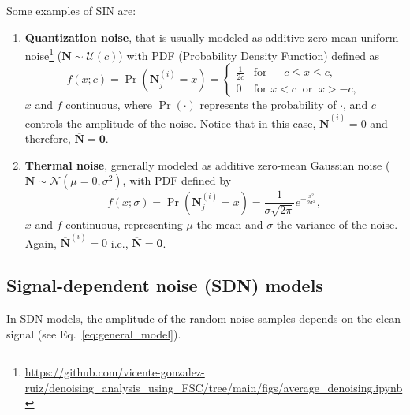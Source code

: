 \documentclass{article}
\begin{document}
Some examples of SIN are:
\begin{enumerate}
\item \textbf{Quantization noise}, that is usually modeled as additive
  zero-mean uniform
  noise\footnote{\url{https://github.com/vicente-gonzalez-ruiz/denoising_analysis_using_FSC/tree/main/figs/average_denoising.ipynb}}
  (${\mathbf N}\sim{\mathcal U}(c)$) with PDF (Probability Density
  Function) defined as
  \begin{equation}
    f(x; c) = \Pr({\mathbf N}^{(i)}_j{=}x) = \begin{cases}
      \frac{1}{2c} & \text{for } -c \le x \le c, \\[8pt]
      0 & \text{for } x < c \ \text{ or } \ x > -c,
    \end{cases}
  \end{equation}
  $x$ and $f$ continuous, where $\Pr(\cdot)$ represents the
  probability of $\cdot$, and $c$ controls the amplitude of the
  noise. Notice that in this case,
  $\overline{\mathbf{N}}^{(i)}=0$ and therefore,
  $\overline{\mathbf N}={\mathbf 0}$.
\item \textbf{Thermal noise}, generally modeled as additive zero-mean
  Gaussian noise (${\mathbf N}\sim{\mathcal N}(\mu=0,\sigma^2)$, with
  PDF defined by
  \begin{equation}
    f(x; \sigma) = \Pr({\mathbf N}^{(i)}_j{=}x) = \frac 1 {\sigma\sqrt{2\pi}} e^{-\frac{x^2}{2\sigma^2} },
  \end{equation}
  $x$ and $f$ continuous, representing $\mu$ the mean and $\sigma$ the
  variance of the noise. Again, $\overline{\mathbf{N}}^{(i)}=0$ i.e.,
  $\overline{\mathbf N}={\mathbf 0}$.
\end{enumerate}

\subsection{Signal-dependent noise (SDN) models}
In SDN models, the amplitude of the random noise samples depends on
the clean signal (see Eq.~\ref{eq:general_model}).

\end{document}
